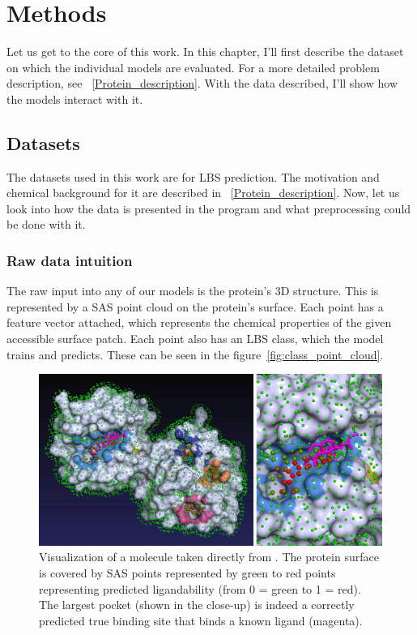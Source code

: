 \chapter{Methods}

Let us get to the core of this work. In this chapter, I'll first describe the dataset on which the individual models are evaluated. For a more detailed problem description, see ~\ref{Protein_description}. With the data described, I'll show how the models interact with it.

\section{Datasets}

The datasets used in this work are for LBS prediction. The motivation and chemical background for it are described in ~\ref{Protein_description}. Now, let us look into how the data is presented in the program and what preprocessing could be done with it.

\subsection{Raw data intuition}

The raw input into any of our models is the protein's 3D structure. This is represented by a SAS point cloud on the protein's surface. Each point has a feature vector attached, which represents the chemical properties of the given accessible surface patch. Each point also has an LBS class, which the model trains and predicts. These can be seen in the figure~\ref{fig:class_point_cloud}.

\begin{figure}
    \centering
    \includegraphics[width=0.5\linewidth]{p2rank.jpg}
    \caption{Visualization of a molecule taken directly from \cite{P2RANK}. The protein surface is covered by SAS points represented by green to red points representing predicted ligandability  (from 0 = green to 1 = red). The largest pocket (shown in the close-up) is indeed a correctly predicted true binding site that binds a known ligand (magenta).}
    \label{fig:p2rank_visualization}
\end{figure}

